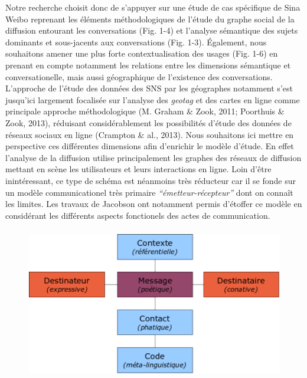 Notre recherche choisit donc de s{\textquoteright}appuyer sur une
\'etude de cas sp\'ecifique de Sina Weibo reprenant les \'el\'ements
m\'ethodologiques de l{\textquoteright}\'etude du graphe social de la
diffusion entourant les conversations (Fig. 1-4) et
l{\textquoteright}analyse s\'emantique des sujets dominants et
sous-jacents aux conversations (Fig. 1-3). \'Egalement, nous souhaitons
amener une plus forte contextualisation des usages (Fig. 1-6) en
prenant en compte notamment les relations entre les dimensions
s\'emantique et conversationelle, mais aussi g\'eographique de
l{\textquoteright}existence des conversations.
L{\textquoteright}approche de l{\textquoteright}\'etude des donn\'ees
des SNS par les g\'eographes notamment s{\textquoteright}est
jusqu{\textquoteright}ici largement focalis\'ee sur
l{\textquoteright}analyse des \textit{geotag} et des cartes en ligne
comme principale approche m\'ethodologique (M. Graham \& Zook, 2011;
Poorthuis \& Zook, 2013), r\'eduisant consid\'erablement les
possibilit\'es d{\textquoteright}\'etude des donn\'ees de r\'eseaux
sociaux en ligne (Crampton \& al., 2013). Nous souhaitons ici mettre en
perspective ces diff\'erentes dimensions afin
d{\textquoteright}enrichir le mod\`ele d{\textquoteright}\'etude. En
effet l{\textquoteright}analyse de la diffusion utilise principalement
les graphes des r\'eseaux de diffusion mettant en sc\`ene les
utilisateurs et leurs interactions en ligne. Loin
d{\textquoteright}\^etre inint\'eressant, ce type de sch\'ema est
n\'eanmoins tr\`es r\'educteur car il se fonde sur un mod\`ele
communicationel tr\`es primaire
\textit{{\textquotedblleft}\'emetteur-r\'ecepteur{\textquotedblright}
}dont on conna\^it les limites. Les travaux de Jacobson ont notamment
permis d{\textquoteright}\'etoffer ce mod\`ele en consid\'erant les
diff\'erents aspects fonctionels des actes de communication.



\begin{figure}
    \centering

    \includegraphics[width=4.6894in,height=2.6114in]{figures/chap3/chapitre3-img5.png}


\end{figure}

